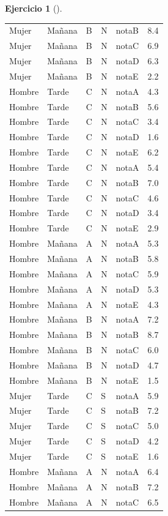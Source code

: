 \documentclass[
  a4paper,
]{scrreport}
\theoremstyle{definition}
\newtheorem{exercise}{Ejercicio}[chapter]
\theoremstyle{remark}
\begin{document}
\begin{exercise}[]
\begin{enumerate}
\begin{tcolorbox}
\begin{longtable}[]{@{}lllllr@{}}
  Mujer & Mañana & B & N & notaB & 8.4 \\
  Mujer & Mañana & B & N & notaC & 6.9 \\
  Mujer & Mañana & B & N & notaD & 6.3 \\
  Mujer & Mañana & B & N & notaE & 2.2 \\
  Hombre & Tarde & C & N & notaA & 4.3 \\
  Hombre & Tarde & C & N & notaB & 5.6 \\
  Hombre & Tarde & C & N & notaC & 3.4 \\
  Hombre & Tarde & C & N & notaD & 1.6 \\
  Hombre & Tarde & C & N & notaE & 6.2 \\
  Hombre & Tarde & C & N & notaA & 5.4 \\
  Hombre & Tarde & C & N & notaB & 7.0 \\
  Hombre & Tarde & C & N & notaC & 4.6 \\
  Hombre & Tarde & C & N & notaD & 3.4 \\
  Hombre & Tarde & C & N & notaE & 2.9 \\
  Hombre & Mañana & A & N & notaA & 5.3 \\
  Hombre & Mañana & A & N & notaB & 5.8 \\
  Hombre & Mañana & A & N & notaC & 5.9 \\
  Hombre & Mañana & A & N & notaD & 5.3 \\
  Hombre & Mañana & A & N & notaE & 4.3 \\
  Hombre & Mañana & B & N & notaA & 7.2 \\
  Hombre & Mañana & B & N & notaB & 8.7 \\
  Hombre & Mañana & B & N & notaC & 6.0 \\
  Hombre & Mañana & B & N & notaD & 4.7 \\
  Hombre & Mañana & B & N & notaE & 1.5 \\
  Mujer & Tarde & C & S & notaA & 5.9 \\
  Mujer & Tarde & C & S & notaB & 7.2 \\
  Mujer & Tarde & C & S & notaC & 5.0 \\
  Mujer & Tarde & C & S & notaD & 4.2 \\
  Mujer & Tarde & C & S & notaE & 1.6 \\
  Hombre & Mañana & A & N & notaA & 6.4 \\
  Hombre & Mañana & A & N & notaB & 7.2 \\
  Hombre & Mañana & A & N & notaC & 6.5 \\

\end{longtable}
\end{tcolorbox}
\end{enumerate}
\end{exercise}
\end{document}
